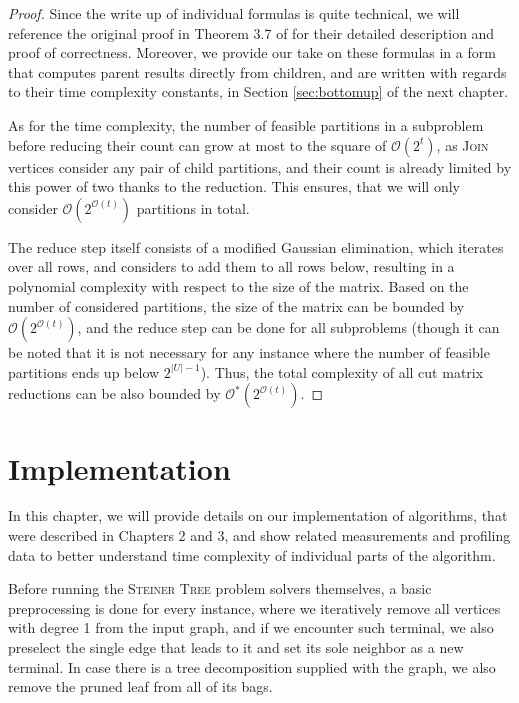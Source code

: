 \documentclass[thesis=M,english,hidelinks]{FITthesis}[2012/10/20]
\theoremstyle{definition}
\begin{document}
\begin{proof}
    Since the write up of individual formulas is quite technical, we will reference the original proof in Theorem 3.7 of
    \cite{Bodlaender2012} for their detailed description and proof of correctness. Moreover, we provide our take on
    these formulas in a form that computes parent results directly from children, and are written with regards to their
    time complexity constants, in Section \ref{sec:bottomup} of the next chapter.

    As for the time complexity, the number of feasible partitions in a subproblem before reducing their count can grow
    at most to the square of $\mathcal{O}(2^t)$, as \textsc{Join} vertices consider any pair of child partitions, and their
    count is already limited by this power of two thanks to the reduction. This ensures, that we will only consider
    $\mathcal{O}(2^{\mathcal{O}(t)})$ partitions in total.
    
    The reduce step itself consists of a modified Gaussian elimination, which iterates over all rows, and considers to
    add them to all rows below, resulting in a polynomial complexity with respect to the size of the matrix. Based on the number
    of considered partitions, the size of the matrix can be bounded by $\mathcal{O}(2^{\mathcal{O}(t)})$, and the reduce
    step can be done for all subproblems (though it can be noted that it is not necessary for any instance where the
    number of feasible partitions ends up below $2^{|U| - 1}$). Thus, the total complexity of all cut matrix reductions
    can be also bounded by $\mathcal{O}^*(2^{\mathcal{O}(t)})$.
\end{proof}


\chapter{Implementation}
\label{chap:implementation}

In this chapter, we will provide details on our implementation of algorithms, that were described in Chapters 2 and 3,
and show related measurements and profiling data to better understand time complexity of individual parts of the
algorithm.

Before running the \textsc{Steiner Tree} problem solvers themselves, a basic preprocessing is done for every instance,
where we iteratively remove all vertices with degree 1 from the input graph, and if we encounter such terminal, we also
preselect the single edge that leads to it and set its sole neighbor as a new terminal. In case there is a tree
decomposition supplied with the graph, we also remove the pruned leaf from all of its bags.
\end{document}
